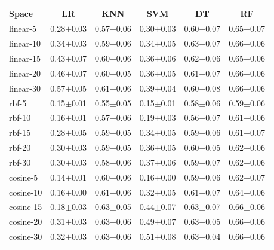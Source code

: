 \begin{tabular}{lccccc}
\toprule
Space & LR & KNN & SVM & DT & RF \\
\midrule
linear-5 & 0.28$\pm$0.03 & 0.57$\pm$0.06 & 0.30$\pm$0.03 & 0.60$\pm$0.07 & 0.65$\pm$0.07 \\
linear-10 & 0.34$\pm$0.03 & 0.59$\pm$0.06 & 0.34$\pm$0.05 & 0.63$\pm$0.07 & 0.66$\pm$0.06 \\
linear-15 & 0.43$\pm$0.07 & 0.60$\pm$0.06 & 0.36$\pm$0.06 & 0.62$\pm$0.06 & 0.65$\pm$0.06 \\
linear-20 & 0.46$\pm$0.07 & 0.60$\pm$0.05 & 0.36$\pm$0.05 & 0.61$\pm$0.07 & 0.66$\pm$0.06 \\
linear-30 & 0.57$\pm$0.05 & 0.61$\pm$0.06 & 0.39$\pm$0.04 & 0.60$\pm$0.08 & 0.66$\pm$0.06 \\
rbf-5 & 0.15$\pm$0.01 & 0.55$\pm$0.05 & 0.15$\pm$0.01 & 0.58$\pm$0.06 & 0.59$\pm$0.06 \\
rbf-10 & 0.16$\pm$0.01 & 0.57$\pm$0.06 & 0.19$\pm$0.03 & 0.56$\pm$0.07 & 0.61$\pm$0.06 \\
rbf-15 & 0.28$\pm$0.05 & 0.59$\pm$0.05 & 0.34$\pm$0.05 & 0.59$\pm$0.06 & 0.61$\pm$0.07 \\
rbf-20 & 0.30$\pm$0.03 & 0.59$\pm$0.05 & 0.36$\pm$0.05 & 0.60$\pm$0.05 & 0.62$\pm$0.06 \\
rbf-30 & 0.30$\pm$0.03 & 0.58$\pm$0.06 & 0.37$\pm$0.06 & 0.59$\pm$0.07 & 0.62$\pm$0.06 \\
cosine-5 & 0.14$\pm$0.01 & 0.60$\pm$0.06 & 0.16$\pm$0.00 & 0.59$\pm$0.06 & 0.62$\pm$0.07 \\
cosine-10 & 0.16$\pm$0.00 & 0.61$\pm$0.06 & 0.32$\pm$0.05 & 0.61$\pm$0.07 & 0.64$\pm$0.06 \\
cosine-15 & 0.18$\pm$0.03 & 0.63$\pm$0.05 & 0.44$\pm$0.07 & 0.63$\pm$0.07 & 0.66$\pm$0.06 \\
cosine-20 & 0.31$\pm$0.03 & 0.63$\pm$0.06 & 0.49$\pm$0.07 & 0.63$\pm$0.05 & 0.66$\pm$0.06 \\
cosine-30 & 0.32$\pm$0.03 & 0.63$\pm$0.06 & 0.51$\pm$0.08 & 0.63$\pm$0.04 & 0.66$\pm$0.06 \\
\bottomrule
\end{tabular}

